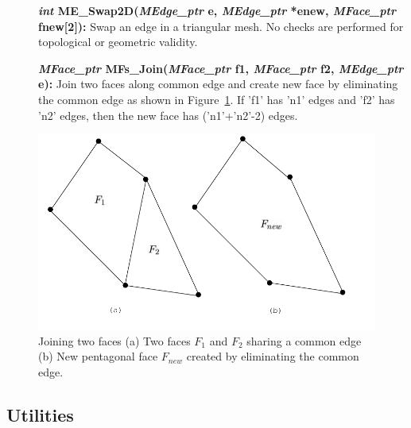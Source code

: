 \documentclass[12pt]{article}
\begin{document}
\begin{description}

\item[]\textbf{\textit{int} ME\_Swap2D(\textit{MEdge\_ptr} e,
\textit{MEdge\_ptr} *enew, \textit{MFace\_ptr} fnew[2]):} Swap an edge
in a triangular mesh. No checks are performed for topological or
geometric validity.

\item[]\textbf{\textit{MFace\_ptr} MFs\_Join(\textit{MFace\_ptr} f1,
\textit{MFace\_ptr} f2, \textit{MEdge\_ptr} e):} Join two faces along
common edge and create new face by eliminating the common edge as
shown in Figure~\ref{fig:MFs_Join}. If 'f1' has 'n1' edges and 'f2'
has 'n2' edges, then the new face has ('n1'+'n2'-2) edges.

\end{description}

\begin{figure}[!h]
  \begin{center}
    \includegraphics[scale=1.0]{figures/MFs_Join}
    
    \caption{Joining two faces (a) Two faces $F_1$ and $F_2$ sharing a
      common edge (b) New pentagonal face $F_{new}$ created by
      eliminating the common edge.  }
    \label{fig:MFs_Join}
  \end{center}
\end{figure}

\newpage
\subsection{Utilities}
  
\end{document}
